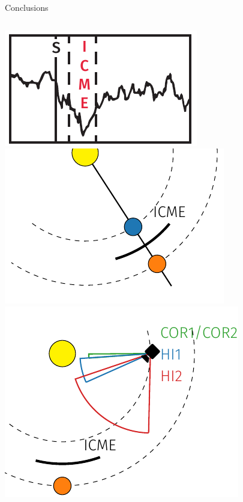 \documentclass[10pt,aspectratio=169,usenames,dvipsnames]{beamer}
\begin{document}
\begin{frame}{Conclusions}
\begin{columns}[T]
\begin{column}{0.1\textwidth}
            \includegraphics[width=\textwidth]{images/summary_pics/02_fd.PNG}\\[2mm]
            \includegraphics[width=\textwidth]{images/summary_pics/03_decelerate.PNG}\\
            \includegraphics[width=\textwidth]{images/summary_pics/04_hi.PNG}\\

\end{column}
\end{columns}
\end{frame}
\end{document}
